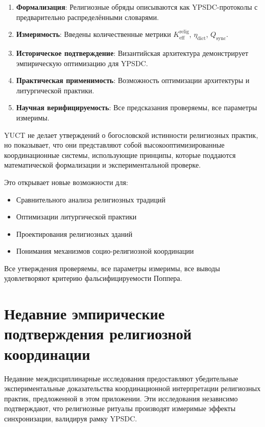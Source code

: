 \documentclass[12pt,a4paper]{article}
\begin{document}
	\begin{enumerate}
		\item \textbf{Формализация}: Религиозные обряды описываются как YPSDC-протоколы с предварительно распределёнными словарями.
		\item \textbf{Измеримость}: Введены количественные метрики $K_{\mathrm{eff}}^{\mathrm{relig}}$, $\eta_{\mathrm{dict}}$, $Q_{\mathrm{sync}}$.
		\item \textbf{Историческое подтверждение}: Византийская архитектура демонстрирует эмпирическую оптимизацию для YPSDC.
		\item \textbf{Практическая применимость}: Возможность оптимизации архитектуры и литургической практики.
		\item \textbf{Научная верифицируемость}: Все предсказания проверяемы, все параметры измеримы.
	\end{enumerate}
	
	YUCT не делает утверждений о богословской истинности религиозных практик, но показывает, что они представляют собой высокооптимизированные координационные системы, использующие принципы, которые поддаются математической формализации и экспериментальной проверке.
	
	Это открывает новые возможности для:
	\begin{itemize}
		\item Сравнительного анализа религиозных традиций
		\item Оптимизации литургической практики
		\item Проектирования религиозных зданий
		\item Понимания механизмов социо-религиозной координации
	\end{itemize}
	
	Все утверждения проверяемы, все параметры измеримы, все выводы удовлетворяют критерию фальсифицируемости Поппера.
	
	\section{Недавние эмпирические подтверждения религиозной координации}
	\label{sec:recent-studies}
	
	Недавние междисциплинарные исследования предоставляют убедительные экспериментальные доказательства координационной интерпретации религиозных практик, предложенной в этом приложении. Эти исследования независимо подтверждают, что религиозные ритуалы производят измеримые эффекты синхронизации, валидируя рамку YPSDC.
	
\end{document}
